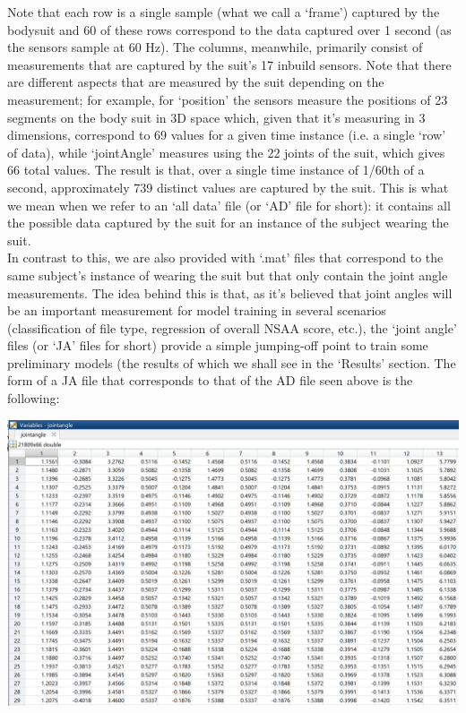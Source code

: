 \documentclass[12pt,twoside]{report}
\begin{document}
\quad Note that each row is a single sample (what we call a ‘frame’) captured by the bodysuit and 60 of these rows correspond to the data captured over 1 second (as the sensors sample at 60 Hz). The columns, meanwhile, primarily consist of measurements that are captured by the suit’s 17 inbuild sensors. Note that there are different aspects that are measured by the suit depending on the measurement; for example, for ‘position’ the sensors measure the positions of 23 segments on the body suit in 3D space which, given that it’s measuring in 3 dimensions, correspond to 69 values for a given time instance (i.e. a single ‘row’ of data), while ‘jointAngle’ measures using the 22 joints of the suit, which gives 66 total values. The result is that, over a single time instance of 1/60th of a second, approximately 739 distinct values are captured by the suit. This is what we mean when we refer to an ‘all data’ file (or ‘AD’ file for short): it contains all the possible data captured by the suit for an instance of the subject wearing the suit.\\

\quad In contrast to this, we are also provided with ‘.mat’ files that correspond to the same subject’s instance of wearing the suit but that only contain the joint angle measurements. The idea behind this is that, as it’s believed that joint angles will be an important measurement for model training in several scenarios (classification of file type, regression of overall NSAA score, etc.), the ‘joint angle’ files (or ‘JA’ files for short) provide a simple jumping-off point to train some preliminary models (the results of which we shall see in the ‘Results’ section. The form of a JA file that corresponds to that of the AD file seen above is the following:

\begin{center}
\includegraphics[scale=0.25]{project_figures/fig8_3}
\end{center}
\end{document}
